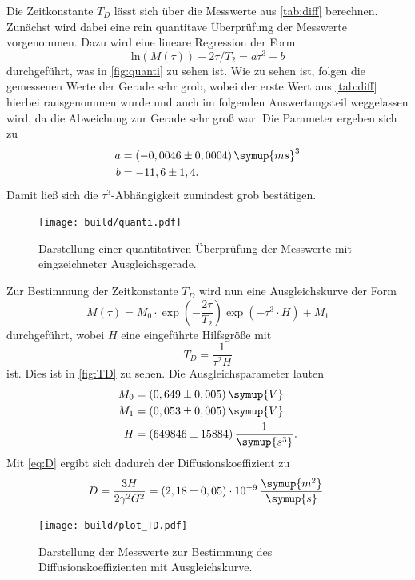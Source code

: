 Die Zeitkonstante $T_D$ lässt sich über die Messwerte aus \autoref{tab:diff} berechnen.
Zunächst wird dabei eine rein quantitave Überprüfung der Messwerte vorgenommen.
Dazu wird eine lineare Regression der Form 
\begin{equation*}
     \text{ln}(M(\tau)) - 2\tau /T_2 = a \tau^3 + b
\end{equation*}     
durchgeführt,
was in \autoref{fig:quanti} zu sehen ist.
Wie zu sehen ist, folgen die gemessenen Werte der Gerade sehr grob, wobei der erste Wert aus \autoref{tab:diff}
hierbei rausgenommen wurde und auch im folgenden Auswertungsteil weggelassen wird, da die Abweichung zur Gerade 
sehr groß war.
Die Parameter ergeben sich zu 
\begin{align*}
    a &= (-0,0046 \pm 0,0004) \, \symup{ms}^3 \\
    b &= -11,6 \pm 1,4.
\end{align*}
Damit ließ sich die $\tau^3$-Abhängigkeit zumindest grob bestätigen.\\
\begin{figure}
    \centering
    \texttt{[image: build/quanti.pdf]}
    \caption{Darstellung einer quantitativen Überprüfung der Messwerte mit eingzeichneter Ausgleichsgerade.}
    \label{fig:quanti}
\end{figure}
Zur Bestimmung der Zeitkonstante $T_D$ wird nun eine Ausgleichskurve der Form 
\begin{equation*}
    M(\tau) = M_0 \cdot \exp \left( - \frac{2 \tau}{T_2}  \right) \exp \left( - \tau^3 \cdot H   \right) + M_1
\end{equation*}
durchgeführt, wobei $H$ eine eingeführte Hilfsgröße mit 
\begin{equation*}
    T_D = \frac{1}{\tau^2 H}
\end{equation*}
ist. Dies ist in \autoref{fig:TD} zu sehen.
Die Ausgleichsparameter lauten
\begin{align*}
    M_0 &= (0,649 \pm 0,005) \, \symup{V} \\
    M_1 &= (0,053 \pm 0,005) \, \symup{V} \\
    H   &= (649846 \pm 15884) \, \frac{1}{\symup{s^3}}.
\end{align*}
Mit \autoref{eq:D} ergibt sich dadurch der Diffusionskoeffizient zu
\begin{equation*}
    D = \frac{3 H}{2 \gamma^2 G^2} = (2,18 \pm 0,05 ) \cdot 10^{-9} \, \frac{\symup{m^2}}{\symup{s}}.
\end{equation*}
\begin{figure}
    \centering
    \texttt{[image: build/plot\_TD.pdf]}
    \caption{Darstellung der Messwerte zur Bestimmung des Diffusionskoeffizienten mit Ausgleichskurve.}
    \label{fig:TD}
\end{figure}

